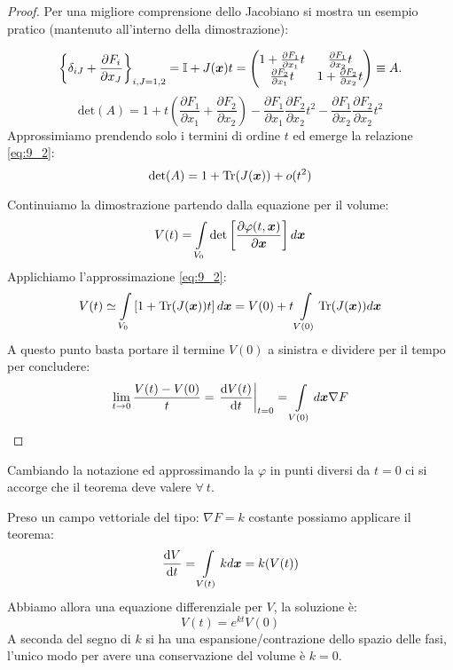 \begin{proof}
    Per una migliore comprensione dello Jacobiano si mostra un esempio pratico (mantenuto all'interno della dimostrazione):
    \begin{exmp}
	\[\begin{aligned}
	    \left\{\delta_{iJ} + \frac{\partial F_i}{\partial x_J} \right\}_{i, J=1,2} = \mathbb{I} + J(\boldsymbol{x})t =  
	    \begin{pmatrix}
		1 + \frac{\partial F_1}{\partial x_1} t 	&     \frac{\partial F_1}{\partial x_2} t \\
		\frac{\partial F_2}{\partial x_1} t 		&     1 + \frac{\partial F_2}{\partial x_2} t
	    \end{pmatrix} 
	    \equiv A
	.\end{aligned}\]
	\[
	    \text{det}(A) = 1 + t\left(\frac{\partial F_1}{\partial x_1} + \frac{\partial F_2}{\partial x_2} \right) - 
	    \frac{\partial F_1}{\partial x_1} \frac{\partial F_2}{\partial x_2} t^2 - \frac{\partial F_1}{\partial x_2} \frac{\partial F_2}{\partial x_2} t^2
	\] 
	Approssimiamo prendendo solo i termini di ordine $t$ ed emerge la relazione \ref{eq:9_2}:
	\[
	    \text{det}(A) = 1 + \text{Tr}(J(\boldsymbol{x})) + o(t^2)
	\] 
    \end{exmp}
    \noindent
    Continuiamo la dimostrazione partendo dalla equazione per il volume:
    \[
	V(t) = \int\limits_{V_0} \text{det}\left[\frac{\partial \varphi (t,\boldsymbol{x})}{\partial \boldsymbol{x}} \right]d\boldsymbol{x}
    \] 
    Applichiamo l'approssimazione \ref{eq:9_2}:
    \[
	V(t) \simeq \int\limits_{V_0} \left[ 1 + \text{Tr}(J(\boldsymbol{x}))t \right]d\boldsymbol{x} = 
	V(0) + t\int\limits_{V(0)} \text{Tr}(J(\boldsymbol{x}))d\boldsymbol{x}
    \] 
    A questo punto basta portare il termine $V(0)$  a sinistra e dividere per il tempo per concludere:
    \[
	\lim_{t \to 0} \frac{V(t)-V(0)}{t} = \left.\frac{\text{d} V(t)}{\text{d} t} \right|_{t=0} = \int\limits_{V(0)} d\boldsymbol{x}\nabla F
    \] 
\end{proof}
\noindent
Cambiando la notazione ed approssimando la $\varphi$ in punti diversi da $t=0$ ci si accorge che il teorema deve valere $\forall \ t$.
\begin{exmp}
    Preso un campo vettoriale del tipo: $\nabla F = k $ costante possiamo applicare il teorema:
    \[
	\frac{\text{d} V}{\text{d} t} = \int\limits_{V(t)} k d\boldsymbol{x} = k(V(t))
    \] 
    Abbiamo allora una equazione differenziale per $V$, la soluzione è:
    \[
	V(t)=e^{kt}V(0)
    \] 
    A seconda del segno di $k$ si ha una espansione/contrazione dello spazio delle fasi, l'unico modo per avere una conservazione del volume è $k=0$.
\end{exmp}
\noindent
